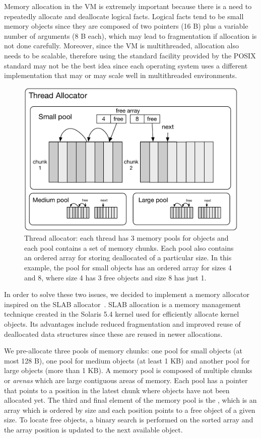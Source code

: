 
Memory allocation in the VM is extremely important because there is a need to
repeatedly allocate and deallocate logical facts. Logical facts tend to be small
memory objects since they are composed of two pointers (16 B) plus a variable
number of arguments (8 B each), which may lead to fragmentation if allocation is
not done carefully.  Moreover, since the VM is multithreaded, allocation also
needs to be scalable, therefore using the standard  facility
provided by the POSIX standard may not be the best idea since each operating
system uses a different implementation that may or may scale well in
multithreaded environments.

\begin{figure}[ht]
   \begin{center}
      \includegraphics[width=0.7\linewidth]{figures/implementation/pool.pdf}
   \end{center}
   \caption{Thread allocator: each thread has 3 memory pools for objects and
      each pool contains a set of memory chunks. Each pool also contains an ordered array 
   for storing deallocated of a particular size. In this example, the pool for
small objects has an ordered array for sizes 4 and 8, where size 4 has 3 free
objects and size 8 has just 1.}
   \label{fig:implementation:pool}
\end{figure}

In order to solve these two issues, we decided to implement a memory allocator
inspired on the SLAB allocator~\cite{Bonwick-94}. SLAB allocation is a memory
management technique created in the Solaris 5.4 kernel used for efficiently
allocate kernel objects. Its advantages include reduced fragmentation and
improved reuse of deallocated data structures since these are reused in newer
allocations.

We pre-allocate three pools of memory chunks: one pool for small objects (at
most 128 B), one pool for medium objects (at least 1 KB) and another pool for
large objects (more than 1 KB).  A memory pool is composed of multiple chunks or
\emph{arenas} which are large contiguous areas of memory. Each pool has
a  pointer that points to a position in the latest chunk where
objects have not been allocated yet. The third and final element of the memory
pool is the , which is an
array which is ordered by size and each position points to a free object of a
given size. To locate free objects, a binary search is performed on the sorted
array and the array position is updated to the next available object.

